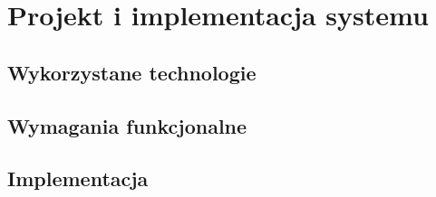 \chapter{Projekt i implementacja systemu}
\section{Wykorzystane technologie}
\section{Wymagania funkcjonalne}
\section{Implementacja}

